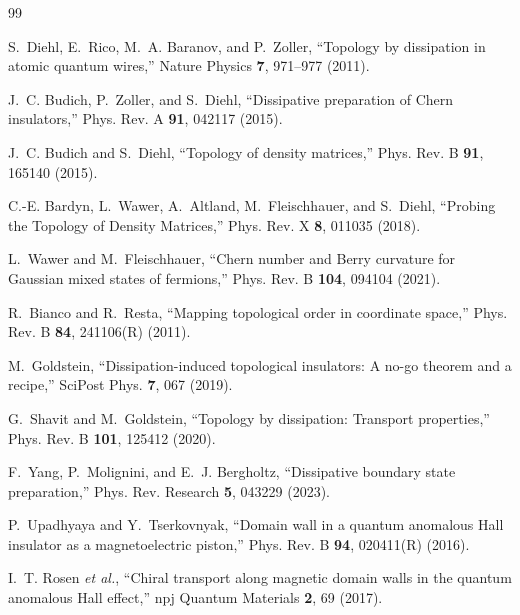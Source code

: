 \documentclass[aps,prb,onecolumn,nofootinbib,superscriptaddress]{revtex4-2}
\begin{document}
\begin{thebibliography}{99}

S.~Diehl, E.~Rico, M.~A. Baranov, and P.~Zoller,
``Topology by dissipation in atomic quantum wires,''
Nature Physics \textbf{7}, 971--977 (2011).

J.~C. Budich, P.~Zoller, and S.~Diehl,
``Dissipative preparation of Chern insulators,''
Phys. Rev. A \textbf{91}, 042117 (2015).

J.~C. Budich and S.~Diehl,
``Topology of density matrices,''
Phys. Rev. B \textbf{91}, 165140 (2015).

C.-E. Bardyn, L.~Wawer, A.~Altland, M.~Fleischhauer, and S.~Diehl,
``Probing the Topology of Density Matrices,''
Phys. Rev. X \textbf{8}, 011035 (2018).

L.~Wawer and M.~Fleischhauer,
``Chern number and Berry curvature for Gaussian mixed states of fermions,''
Phys. Rev. B \textbf{104}, 094104 (2021).

R.~Bianco and R.~Resta,
``Mapping topological order in coordinate space,''
Phys. Rev. B \textbf{84}, 241106(R) (2011).

M.~Goldstein,
``Dissipation-induced topological insulators: A no-go theorem and a recipe,''
SciPost Phys. \textbf{7}, 067 (2019).

G.~Shavit and M.~Goldstein,
``Topology by dissipation: Transport properties,''
Phys. Rev. B \textbf{101}, 125412 (2020).

F.~Yang, P.~Molignini, and E.~J. Bergholtz,
``Dissipative boundary state preparation,''
Phys. Rev. Research \textbf{5}, 043229 (2023).

P.~Upadhyaya and Y.~Tserkovnyak,
``Domain wall in a quantum anomalous Hall insulator as a magnetoelectric piston,''
Phys. Rev. B \textbf{94}, 020411(R) (2016).

I.~T. Rosen \textit{et al.},
``Chiral transport along magnetic domain walls in the quantum anomalous Hall effect,''
npj Quantum Materials \textbf{2}, 69 (2017).

\end{thebibliography}
\end{document}
